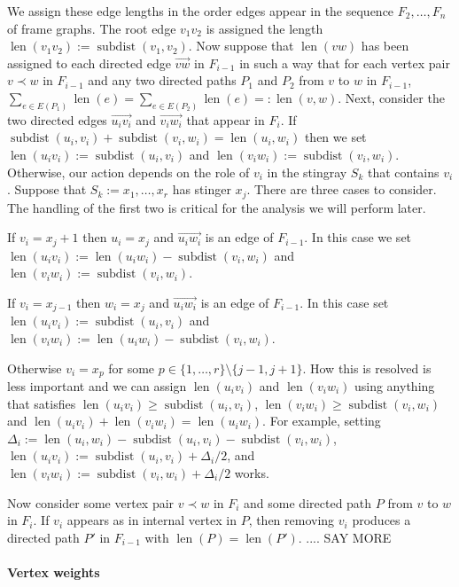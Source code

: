 \documentclass{patmorin}
\DeclareMathOperator{\sd}{subdist}
\DeclareMathOperator{\len}{len}
\begin{document}
We assign these edge lengths in the order edges appear in the sequence $F_2,\ldots,F_n$ of frame graphs.  The root edge $v_1v_2$ is assigned the length $\len(v_1v_2):=\sd(v_1,v_2)$. Now suppose that $\len(vw)$ has been assigned to each directed edge $\overrightarrow{vw}$ in $F_{i-1}$ in such a way that for each vertex pair $v\prec w$ in $F_{i-1}$ and any two directed paths $P_1$ and $P_2$ from $v$ to $w$ in $F_{i-1}$, $\sum_{e\in E(P_1)}\len(e) = \sum_{e\in E(P_2)}\len(e)=:\len(v,w)$.  Next, consider the two directed edges $\overrightarrow{u_iv_i}$ and $\overrightarrow{v_iw_i}$ that appear in $F_i$. If $\sd(u_i,v_i)+\sd(v_i,w_i)=\len(u_i,w_i)$ then we set $\len(u_iv_i):=\sd(u_i,v_i)$ and $\len(v_iw_i):=\sd(v_i,w_i)$.  Otherwise, our action depends on the role of $v_i$ in the stingray $S_k$ that contains $v_i$.  Suppose that $S_k:=x_1,\ldots,x_r$ has stinger $x_j$.  There are three cases to consider.  The handling of the first two is critical for the analysis we will perform later.
\begin{compactenum}
  \item If $v_i=x_j+1$ then $u_i=x_j$ and $\overrightarrow{u_iw_i}$ is an edge of $F_{i-1}$.  In this case we set $\len(u_iv_i):=\len(u_iw_i)-\sd(v_i,w_i)$ and $\len(v_iw_i):=\sd(v_i,w_i)$.

  \item If $v_i=x_{j-1}$ then $w_i=x_j$ and $\overrightarrow{u_iw_i}$ is an edge of $F_{i-1}$.  In this case set $\len(u_iv_i):=\sd(u_i,v_i)$ and $\len(v_iw_i):=\len(u_iw_i)-\sd(v_i,w_i)$.

  \item Otherwise $v_i=x_p$ for some $p\in\{1,\ldots,r\}\setminus\{j-1,j+1\}$. How this is resolved is less important and we can assign $\len(u_iv_i)$ and $\len(v_iw_i)$ using anything that satisfies $\len(u_iv_i)\ge\sd(u_i,v_i)$, $\len(v_iw_i)\ge\sd(v_i,w_i)$ and $\len(u_iv_i)+\len(v_iw_i)=\len(u_iw_i)$.  For example, setting $\Delta_i:=\len(u_i,w_i)-\sd(u_i,v_i)-\sd(v_i,w_i)$,  $\len(u_iv_i):=\sd(u_i,v_i)+\Delta_i/2$, and $\len(v_iw_i):=\sd(v_i,w_i)+\Delta_i/2$ works.
\end{compactenum}
Now consider some vertex pair $v\prec w$ in $F_i$ and some directed path $P$ from $v$ to $w$ in $F_i$.  If $v_i$ appears as in internal vertex in $P$, then removing $v_i$ produces a directed path $P'$ in $F_{i-1}$ with $\len(P)=\len(P')$. .... SAY MORE

\paragraph{Vertex weights}
\end{document}
